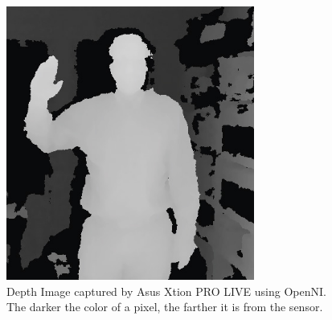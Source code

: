 \begin{figure}
	[h] \centering 
	\includegraphics[height=9cm]{figures/content/xtion-depth.jpg} 	
	\caption{Depth Image captured by Asus Xtion PRO LIVE using OpenNI. The darker the color of a pixel, the farther it is from the sensor. \cite{9} } \label{fg:xtion:depth} 
\end{figure}
